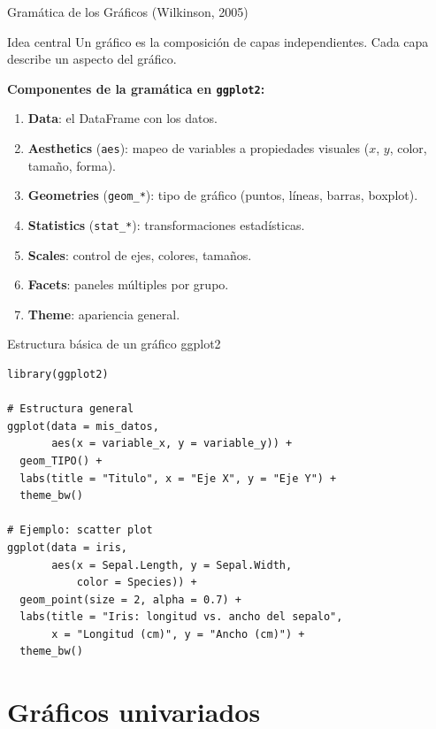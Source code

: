 \documentclass[aspectratio=169]{beamer}
\begin{document}
\begin{frame}{Gramática de los Gráficos (Wilkinson, 2005)}
  \begin{block}{Idea central}
    Un gráfico es la composición de capas independientes. Cada capa describe un aspecto del gráfico.
  \end{block}
  \bigskip
  \textbf{Componentes de la gramática en \texttt{ggplot2}:}
  \begin{enumerate}
    \item \textbf{Data}: el DataFrame con los datos.
    \item \textbf{Aesthetics} (\texttt{aes}): mapeo de variables a propiedades visuales ($x$, $y$, color, tamaño, forma).
    \item \textbf{Geometries} (\texttt{geom\_*}): tipo de gráfico (puntos, líneas, barras, boxplot).
    \item \textbf{Statistics} (\texttt{stat\_*}): transformaciones estadísticas.
    \item \textbf{Scales}: control de ejes, colores, tamaños.
    \item \textbf{Facets}: paneles múltiples por grupo.
    \item \textbf{Theme}: apariencia general.
  \end{enumerate}
\end{frame}

\begin{frame}[fragile]{Estructura básica de un gráfico ggplot2}
\begin{lstlisting}[style=rcode]
library(ggplot2)

# Estructura general
ggplot(data = mis_datos,
       aes(x = variable_x, y = variable_y)) +
  geom_TIPO() +
  labs(title = "Titulo", x = "Eje X", y = "Eje Y") +
  theme_bw()

# Ejemplo: scatter plot
ggplot(data = iris,
       aes(x = Sepal.Length, y = Sepal.Width,
           color = Species)) +
  geom_point(size = 2, alpha = 0.7) +
  labs(title = "Iris: longitud vs. ancho del sepalo",
       x = "Longitud (cm)", y = "Ancho (cm)") +
  theme_bw()
\end{lstlisting}
\end{frame}

\section{Gráficos univariados}
\end{document}
